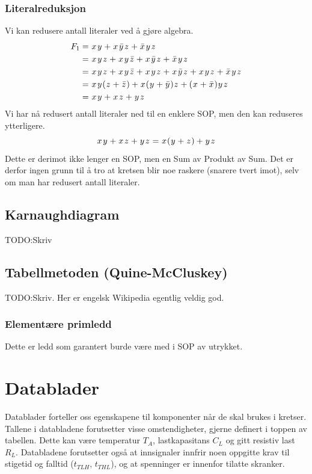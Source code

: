 \documentclass[12pt,a4paper,norsk]{article}
\begin{document}
\subsubsection{Literalreduksjon}
Vi kan redusere antall literaler ved å gjøre algebra.
\begin{align*}
  F_{1} &= \var{x}\var{y} + \var{x}\kom{y}\var{z} + \kom{x}\var{y}\var{z} \\
        &= \var{x}\var{y}\var{z} + \var{x}\var{y}\kom{z} + \var{x}\kom{y}\var{z} + \kom{x}\var{y}\var{z} \\
        &= \var{x}\var{y}\var{z} + \var{x}\var{y}\kom{z} + \var{x}\var{y}\var{z} + \var{x}\kom{y}\var{z} + \var{x}\var{y}\var{z} + \kom{x}\var{y}\var{z} \\
        &= \var{x}\var{y}(\var{z} + \kom{z}) + \var{x}(\var{y} + \kom{y})\var{z} + (\var{x} + \kom{x})\var{y}\var{z} \\
        &= \var{x}\var{y} + \var{x}\var{z} + \var{y}\var{z}
\end{align*}
Vi har nå redusert antall literaler ned til en enklere SOP, men den kan
reduseres ytterligere.
\[\var{x}\var{y} + \var{x}\var{z} + \var{y}\var{z} = \var{x}(\var{y} + \var{z}) + \var{y}\var{z}\]
Dette er derimot ikke lenger en SOP, men en Sum av Produkt av Sum. Det er derfor
ingen grunn til å tro at kretsen blir noe raskere (snarere tvert imot), selv om
man har redusert antall literaler.

\subsection{Karnaughdiagram}
TODO\@:Skriv

\subsection{Tabellmetoden (Quine-McCluskey)}
TODO\@:Skriv. Her er engelsk Wikipedia egentlig veldig god.

\subsubsection{Elementære primledd}
Dette er ledd som garantert burde være med i SOP av utrykket.

\section{Datablader}\label{sec:datablader}
Datablader forteller oss egenskapene til komponenter når de skal brukes i kretser.
Tallene i databladene forutsetter visse omstendigheter, gjerne definert i toppen
av tabellen. Dette kan være temperatur $T_{A}$, lastkapasitans $C_{L}$ og gitt
resistiv last $R_{L}$. Databladene forutsetter også at innsignaler innfrir noen
oppgitte krav til stigetid og falltid ($t_{TLH}$, $t_{THL}$), og at spenninger
er innenfor tilatte skranker.
\end{document}
